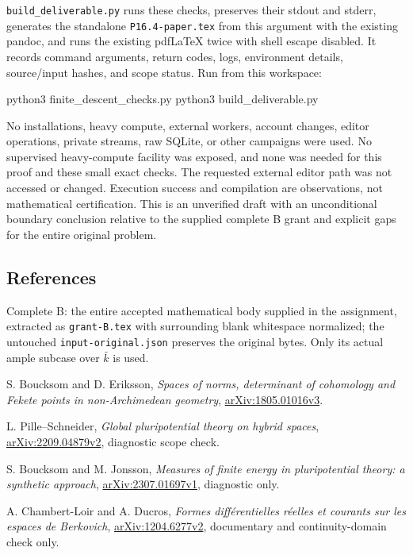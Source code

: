 \documentclass[
  11pt,
]{article}
\newenvironment{Shaded}{}{}
\newcommand{\ExtensionTok}[1]{#1}
\newcommand{\NormalTok}[1]{#1}
\begin{document}
\texttt{build\_deliverable.py} runs these checks, preserves their stdout
and stderr, generates the standalone \texttt{P16.4-paper.tex} from this
argument with the existing pandoc, and runs the existing pdfLaTeX twice
with shell escape disabled. It records command arguments, return codes,
logs, environment details, source/input hashes, and scope status. Run
from this workspace:

\begin{Shaded}
\begin{Highlighting}[]
\ExtensionTok{python3}\NormalTok{ finite\_descent\_checks.py}
\ExtensionTok{python3}\NormalTok{ build\_deliverable.py}
\end{Highlighting}
\end{Shaded}

No installations, heavy compute, external workers, account changes,
editor operations, private streams, raw SQLite, or other campaigns were
used. No supervised heavy-compute facility was exposed, and none was
needed for this proof and these small exact checks. The requested
external editor path was not accessed or changed. Execution success and
compilation are observations, not mathematical certification. This is an
unverified draft with an unconditional boundary conclusion relative to
the supplied complete B grant and explicit gaps for the entire original
problem.

\subsection{References}\label{references}

Complete B: the entire accepted mathematical body supplied in the
assignment, extracted as \texttt{grant-B.tex} with surrounding blank
whitespace normalized; the untouched \texttt{input-original.json}
preserves the original bytes. Only its actual ample subcase over
\(\bar k\) is used.

S. Boucksom and D. Eriksson, \emph{Spaces of norms, determinant of
cohomology and Fekete points in non-Archimedean geometry},
\href{https://arxiv.org/pdf/1805.01016v3}{arXiv:1805.01016v3}.

L. Pille--Schneider, \emph{Global pluripotential theory on hybrid
spaces}, \href{https://arxiv.org/pdf/2209.04879v2}{arXiv:2209.04879v2},
diagnostic scope check.

S. Boucksom and M. Jonsson, \emph{Measures of finite energy in
pluripotential theory: a synthetic approach},
\href{https://arxiv.org/pdf/2307.01697v1}{arXiv:2307.01697v1},
diagnostic only.

A. Chambert-Loir and A. Ducros, \emph{Formes différentielles réelles et
courants sur les espaces de Berkovich},
\href{https://arxiv.org/pdf/1204.6277v2}{arXiv:1204.6277v2}, documentary
and continuity-domain check only.
\end{document}
